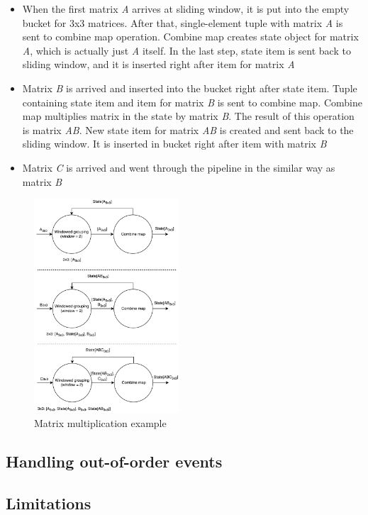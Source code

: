 \begin{itemize}
    \item When the first matrix {\it A} arrives at sliding window, it is put into the empty bucket for 3x3 matrices. After that, single-element tuple with matrix {\it A} is sent to combine map operation. Combine map creates state object for matrix {\it A}, which is actually just {\it A} itself. In the last step, state item is sent back to sliding window, and it is inserted right after item for matrix {\it A}
    \item Matrix {\it B} is arrived and inserted into the bucket right after state item. Tuple containing state item and item for matrix {\it B} is sent to combine map. Combine map multiplies matrix in the state by matrix {\it B}. The result of this operation is matrix {\it AB}. New state item for matrix {\it AB} is created and sent back to the sliding window. It is inserted in bucket right after item with matrix {\it B}
    \item Matrix {\it C} is arrived and went through the pipeline in the similar way as matrix {\it B}
\end{itemize}

\begin{figure}[htbp]
  \centering
  \includegraphics[width=0.48\textwidth]{pics/matrix-example}
  \caption{Matrix multiplication example}
  \label {matrix-example}
\end{figure}

\subsection{Handling out-of-order events}

\subsection{Limitations}
